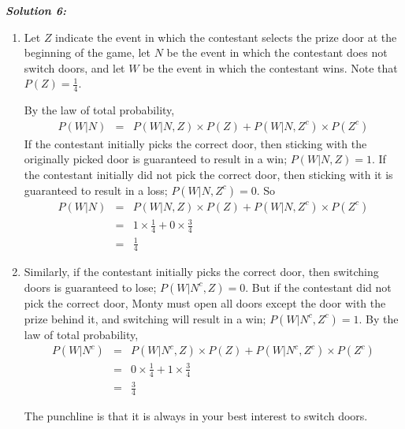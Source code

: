\documentclass[10pt]{amsart}
\begin{document}
\bigskip

\noindent \textit{\textbf{Solution 6:}}
\begin{enumerate}
\medskip
\item Let $Z$ indicate the event in which the contestant selects the prize door at the beginning of the game, let $N$ be the event in which the contestant does not switch doors, and let $W$ be the event in which the contestant wins. Note that $P(Z) = \frac{1}{4}$.

By the law of total probability,
\begin{eqnarray*}
P(W|N) &=& P(W|N, Z) \times P(Z) + P(W|N, Z^c) \times P(Z^c)
\end{eqnarray*}
If the contestant initially picks the correct door, then sticking with the originally picked door is guaranteed to result in a win; $P(W|N,Z) = 1$. If the contestant initially did not pick the correct door, then sticking with it is guaranteed to result in a loss; $P(W|N, Z^c) = 0$. So
\begin{eqnarray*}
P(W|N) &=&  P(W|N, Z) \times P(Z) + P(W|N, Z^c) \times P(Z^c) \\
&=& 1 \times \frac{1}{4} + 0 \times \frac{3}{4} \\
&=& \frac{1}{4}
\end{eqnarray*}
\item Similarly, if the contestant initially picks the correct door, then switching doors is guaranteed to lose; $P(W|N^c, Z) = 0$. But if the contestant did not pick the correct door, Monty must open all doors except the door with the prize behind it, and switching will result in a win; $P(W|N^c, Z^c) = 1$. 
By the law of total probability,
\begin{eqnarray*}
P(W|N^c) &=& P(W|N^c, Z) \times P(Z) + P(W|N^c, Z^c) \times P(Z^c) \\
&=& 0 \times \frac{1}{4} + 1 \times \frac{3}{4} \\
&=& \frac{3}{4}
\end{eqnarray*}

The punchline is that it is always in your best interest to switch doors.

\end{enumerate}
\end{document}
